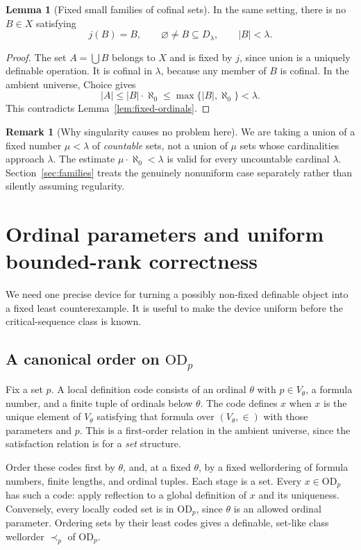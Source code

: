 \documentclass[11pt,letterpaper]{article}
\theoremstyle{definition}
\newtheorem{lemma}[definition]{Lemma}
\newcommand{\OD}{\mathrm{OD}}
\newtheorem{remark}[definition]{Remark}
\numberwithin{equation}{section}
\begin{document}
\begin{lemma}[Fixed small families of cofinal sets]\label{lem:small-family}
In the same setting, there is no $B\in X$ satisfying
\[
 j(B)=B,\qquad \varnothing\ne B\subseteq D_\lambda,
 \qquad |B|<\lambda.
\]
\end{lemma}

\begin{proof}
The set $A=\bigcup B$ belongs to $X$ and is fixed by $j$, since union is a
uniquely definable operation. It is cofinal in $\lambda$, because any member
of $B$ is cofinal. In the ambient universe, Choice gives
\[
 |A|\le |B|\cdot\aleph_0\le\max\{|B|,\aleph_0\}<\lambda.
\]
This contradicts Lemma~\ref{lem:fixed-ordinals}.
\end{proof}

\begin{remark}[Why singularity causes no problem here]\label{rem:singular}
We are taking a union of a fixed number $\mu<\lambda$ of \emph{countable}
sets, not a union of $\mu$ sets whose cardinalities approach $\lambda$.
The estimate $\mu\cdot\aleph_0<\lambda$ is valid for every uncountable
cardinal $\lambda$. Section~\ref{sec:families} treats the genuinely nonuniform
case separately rather than silently assuming regularity.
\end{remark}

\section{Ordinal parameters and uniform bounded-rank correctness}\label{sec:od}

We need one precise device for turning a possibly non-fixed definable object
into a fixed least counterexample. It is useful to make the device uniform
before the critical-sequence class is known.

\subsection{A canonical order on $\OD_p$}

Fix a set $p$. A local definition code consists of an ordinal $\theta$ with
$p\in V_\theta$, a formula number, and a finite tuple of ordinals below
$\theta$. The code defines $x$ when $x$ is the unique element of $V_\theta$
satisfying that formula over $(V_\theta,\in)$ with those parameters and $p$.
This is a first-order relation in the ambient universe, since the satisfaction
relation is for a \emph{set} structure.

Order these codes first by $\theta$, and, at a fixed $\theta$, by a fixed
wellordering of formula numbers, finite lengths, and ordinal tuples. Each
stage is a set. Every $x\in\OD_p$ has such a code: apply reflection to a global
definition of $x$ and its uniqueness. Conversely, every locally coded set is
in $\OD_p$, since $\theta$ is an allowed ordinal parameter. Ordering sets by
their least codes gives a definable, set-like class wellorder $\prec_p$ of
$\OD_p$.
\end{document}
